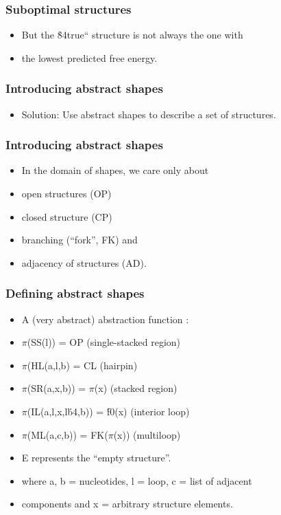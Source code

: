 \documentclass[ignorenonframetext,10pt]{beamer}
\begin{document}
\begin{frame}
\frametitle{Suboptimal structures}
   \begin{itemize} 
   \item But the \'84true`` structure is not always the one with
   \item the lowest predicted free energy.
   \end{itemize}
\end{frame}

\begin{frame}
\frametitle{Introducing abstract shapes}
   \begin{itemize} 
   \item Solution: Use abstract shapes to describe a set of structures.
   \end{itemize}
\end{frame}

\begin{frame}
\frametitle{Introducing abstract shapes}
   \begin{itemize} 
   \item In the domain of shapes, we care only about
   \item open structures (OP)
   \item closed structure (CP)
   \item branching (``fork'', FK) and
   \item adjacency of structures (AD).
   \end{itemize}
\end{frame}

\begin{frame}
\frametitle{Defining abstract shapes}
   \begin{itemize} 
   \item A (very abstract) abstraction function :
   \item $\pi$(SS(l))           = OP      (single-stacked region)
   \item $\pi$(HL(a,l,b)         = CL      (hairpin)
   \item $\pi$(SR(a,x,b))       = $\pi$(x)                       (stacked region)
   \item $\pi$(IL(a,l,x,l\'b4,b))  = \'f0(x)       (interior loop)
   \item $\pi$(ML(a,c,b))       = FK($\pi$(x))                (multiloop) 
   \item E represents the ``empty structure''.
   \item where a, b = nucleotides, l = loop, c = list of adjacent 
   \item components and x = arbitrary structure elements.
   \end{itemize}
\end{frame}
\end{document}
